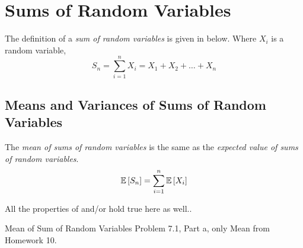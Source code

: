 \section{Sums of Random Variables} \label{sec:Sums of Random Variables}
	\begin{definition} \label{def:Sum of Random Variables}
		The definition of a \emph{sum of random variables} is given in  below.
		Where $X_{i}$ is a random variable,
		\begin{equation} \label{eq:Sum of Random Variables}
			S_{n} = \sum_{i=1}^{n} X_{i} = X_{1} + X_{2} + \ldots + X_{n}
		\end{equation}
	\end{definition}
	
	\subsection{Means and Variances of Sums of Random Variables} \label{subsec:Means and Variances of Sums of Random Variables}
		\begin{definition} \label{def:Mean of Sums of Random Variables}
			The \emph{mean of sums of random variables} is the same as the \emph{expected value of sums of random variables}.
			\begin{equation}
				\operatorname{\operatorname{\mathbb{E}}} \left[ S_{n} \right] = \sum_{i=1}^{n} \operatorname{\operatorname{\mathbb{E}}} \left[ X_{i} \right]
			\end{equation}
			\begin{remark}
				All the properties of  and/or  hold true here as well..
			\end{remark}
		\end{definition}
		\begin{example}[Problem 7.1]{Mean of Sum of Random Variables}
			Problem 7.1, Part a, only Mean from Homework 10.
		\end{example}
